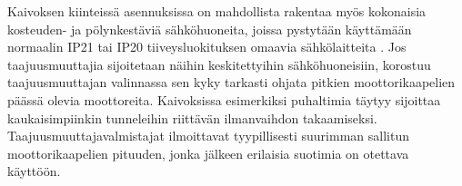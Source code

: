 \documentclass[finnish,12pt,a4paper,pdftex,elec,utf8]{aaltothesis}
\begin{document}
\noindent
Kaivoksen kiinteissä asennuksissa on mahdollista rakentaa myös kokonaisia kosteuden- ja pölynkestäviä sähköhuoneita, joissa pystytään käyttämään normaalin IP21 tai IP20 tiiveysluokituksen omaavia sähkölaitteita \cite[s.253]{Hakapää}. Jos taajuusmuuttajia sijoitetaan näihin keskitettyihin sähköhuoneisiin, korostuu taajuusmuuttajan valinnassa sen kyky tarkasti ohjata pitkien moottorikaapelien päässä olevia moottoreita. Kaivoksissa esimerkiksi puhaltimia täytyy sijoittaa kaukaisimpiinkin tunneleihin riittävän ilmanvaihdon takaamiseksi. Taajuusmuuttajavalmistajat ilmoittavat tyypillisesti suurimman sallitun moottorikaapelien pituuden, jonka jälkeen erilaisia suotimia on otettava käyttöön.








\end{document}
